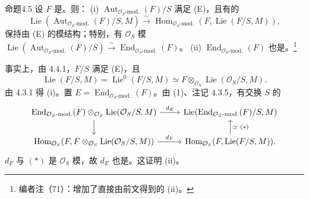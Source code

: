 \begin{SGAresult}{命题}{4.5}
设 $F$ 是。则：
(i) $\operatorname{Aut}_{\mathcal O_S\text{-mod.}}(F)/S$ 满足 (E)，且有的
\[\operatorname{Lie}(\operatorname{Aut}_{\mathcal O_S\text{-mod.}}(F)/S,M)\xrightarrow{\sim}\operatorname{Hom}_{\mathcal O_S\text{-mod.}}(F,\operatorname{Lie}(F/S,M)),\]
保持由 (E) 的模结构；特别，有 $\mathcal O_S$ 模
$\operatorname{Lie}(\operatorname{Aut}_{\mathcal O_S\text{-mod.}}(F)/S)\xrightarrow{\sim}\operatorname{End}_{\mathcal O_S\text{-mod.}}(F)$。
(ii) $\operatorname{End}_{\mathcal O_S\text{-mod.}}(F)$ 也是。\footnote{编者注（71）：增加了直接由前文得到的 (ii)。}
\end{SGAresult}
事实上，由 4.4.1，$F/S$ 满足 (E)，且
\[\operatorname{Lie}(F/S,M)=\operatorname{Lie}^0(F/S,M)\simeq F\otimes_{\mathcal O_S}\operatorname{Lie}(\mathcal O_S/S,M).\tag{1}\]
由 4.3.1 得 (i)。置 $E=\operatorname{End}_{\mathcal O_S\text{-mod.}}(F)$。由 (1)、注记 4.3.5，有交换 $S$ 的
\[\begin{tikzcd}
\operatorname{End}_{\mathcal O_S\text{-mod.}}(F)\otimes_{\mathcal O_S}\operatorname{Lie}(\mathcal O_S/S,M)\arrow[r,"d_E"]\arrow[d]&\operatorname{Lie}(\operatorname{End}_{\mathcal O_S\text{-mod.}}(F)/S,M)\\
\operatorname{Hom}_{\mathcal O_S}(F,F\otimes_{\mathcal O_S}\operatorname{Lie}(\mathcal O_S/S,M))\arrow[r,"d_F"]&\operatorname{Hom}_{\mathcal O_S}(F,\operatorname{Lie}(F/S,M))\arrow[u,"\simeq\ (*)"'].
\end{tikzcd}\]
$d_F$ 与 $(*)$ 是 $\mathcal O_S$ 模，故 $d_E$ 也是。这证明 (ii)。
